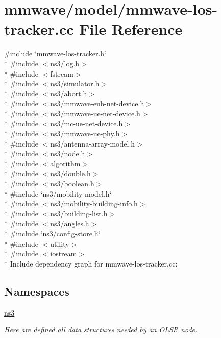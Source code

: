 \hypertarget{mmwave-los-tracker_8cc}{}\section{mmwave/model/mmwave-\/los-\/tracker.cc File Reference}
\label{mmwave-los-tracker_8cc}
{\ttfamily \#include \char`\"{}mmwave-\/los-\/tracker.\+h\char`\"{}}\\*
{\ttfamily \#include $<$ns3/log.\+h$>$}\\*
{\ttfamily \#include $<$fstream$>$}\\*
{\ttfamily \#include $<$ns3/simulator.\+h$>$}\\*
{\ttfamily \#include $<$ns3/abort.\+h$>$}\\*
{\ttfamily \#include $<$ns3/mmwave-\/enb-\/net-\/device.\+h$>$}\\*
{\ttfamily \#include $<$ns3/mmwave-\/ue-\/net-\/device.\+h$>$}\\*
{\ttfamily \#include $<$ns3/mc-\/ue-\/net-\/device.\+h$>$}\\*
{\ttfamily \#include $<$ns3/mmwave-\/ue-\/phy.\+h$>$}\\*
{\ttfamily \#include $<$ns3/antenna-\/array-\/model.\+h$>$}\\*
{\ttfamily \#include $<$ns3/node.\+h$>$}\\*
{\ttfamily \#include $<$algorithm$>$}\\*
{\ttfamily \#include $<$ns3/double.\+h$>$}\\*
{\ttfamily \#include $<$ns3/boolean.\+h$>$}\\*
{\ttfamily \#include \char`\"{}ns3/mobility-\/model.\+h\char`\"{}}\\*
{\ttfamily \#include $<$ns3/mobility-\/building-\/info.\+h$>$}\\*
{\ttfamily \#include $<$ns3/building-\/list.\+h$>$}\\*
{\ttfamily \#include $<$ns3/angles.\+h$>$}\\*
{\ttfamily \#include \char`\"{}ns3/config-\/store.\+h\char`\"{}}\\*
{\ttfamily \#include $<$utility$>$}\\*
{\ttfamily \#include $<$iostream$>$}\\*
Include dependency graph for mmwave-\/los-\/tracker.cc\+:
\subsection*{Namespaces}
\begin{DoxyCompactItemize}
\item 
 \hyperlink{namespacens3}{ns3}
\begin{DoxyCompactList}\small\item\em Here are defined all data structures needed by an O\+L\+SR node. \end{DoxyCompactList}\end{DoxyCompactItemize}
